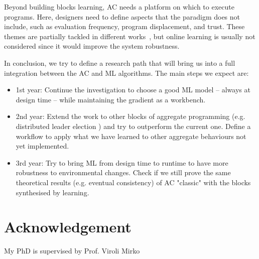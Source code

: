 \documentclass[conference]{IEEEtran}
\begin{document}
Beyond building blocks learning, AC needs a platform on which to execute programs. 
%
Here, designers need to define aspects that the paradigm does not include, such as evaluation frequency, program displacement, and trust.
% 
These themes are partially tackled in different works~\cite{DBLP:journals/scp/CasadeiAV18, DBLP:journals/fi/CasadeiPPVW20, DBLP:journals/corr/abs-2012-13806}, but online learning is usually not considered since it would improve the system robustness.

In conclusion, we try to define a research path that will bring us into a full integration between the AC and ML algorithms.
The main steps we expect are:
\begin{itemize}
    \item 1st year: Continue the investigation to choose a good ML model -- always at design time -- while maintaining the gradient as a workbench.
    \item 2nd year: Extend the work to other blocks of aggregate programming (e.g. distributed leader election ) and try to outperform the current one. Define a workflow to apply what we have learned to other aggregate behaviours not yet implemented.
    \item 3rd year: Try to bring ML from design time to runtime to have more robustness to environmental changes. Check if we still prove the same theoretical results (e.g. eventual consistency) of AC "classic" with the blocks synthesised by learning.
\end{itemize}
\section*{Acknowledgement}
My PhD is supervised by Prof. Viroli Mirko


\end{document}
